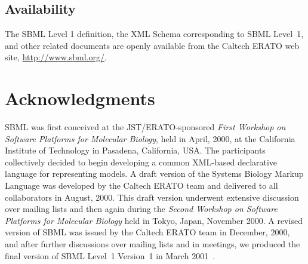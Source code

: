 \documentclass[10pt]{cekarticle}
\newcommand{\changed}[1]{\textcolor{BrickRed}{#1}}
\begin{document}
\subsection{Availability}
\label{sec:availability}

The SBML Level 1 definition, the XML Schema corresponding to SBML Level~1,
and other related documents are openly available from the Caltech ERATO web
site, \changed{\url{http://www.sbml.org/}}.



\setcounter{secnumdepth}{-1}
\section{Acknowledgments}
\label{sec:acknowledgements}

SBML was first conceived at the JST/ERATO-sponsored \emph{First Workshop on
  Software Platforms for Molecular Biology}, held in April, 2000, at the
California Institute of Technology in Pasadena, California, USA.  The
participants collectively decided to begin developing a common XML-based
declarative language for representing models.  A draft version of the
Systems Biology Markup Language was developed by the Caltech ERATO team and
delivered to all collaborators in August, 2000.  This draft version
underwent extensive discussion over mailing lists and then again during the
\emph{Second Workshop on Software Platforms for Molecular Biology} held in
Tokyo, Japan, November 2000.  A revised version of SBML was issued by the
Caltech ERATO team in December, 2000, and after further discussions over
mailing lists and in meetings, we produced the final version of SBML
Level~1 \changed{Version~1 in March 2001~\cite{hucka:2001}}.
\end{document}
